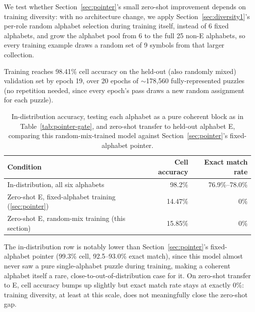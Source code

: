 \documentclass{article} %
\begin{document}
We test whether Section~\ref{sec:pointer}'s small zero-shot improvement
depends on training diversity: with no architecture change, we apply
Section~\ref{sec:diversity1}'s per-role random alphabet selection during
training itself, instead of 6 fixed alphabets, and grow the alphabet
pool from 6 to the full 25 non-E alphabets, so every training example
draws a random set of 9 symbols from that larger collection.

Training reaches 98.41\% cell accuracy on the held-out (also randomly
mixed) validation set by epoch 19, over 20 epochs of $\sim$178{,}560
fully-represented puzzles (no repetition needed, since every epoch's
pass draws a new random assignment for each puzzle).

\begin{table}[h]
\centering
\footnotesize
\begin{tabular}{lrr}
\hline
Condition & Cell accuracy & Exact match rate \\
\hline
In-distribution, all six alphabets & 98.2\% & 76.9\%--78.0\% \\
Zero-shot E, fixed-alphabet training (\ref{sec:pointer}) & 14.47\% & 0\% \\
Zero-shot E, random-mix training (this section) & 15.85\% & 0\% \\
\hline
\end{tabular}
\caption{In-distribution accuracy, testing each alphabet as a pure
coherent block as in Table~\ref{tab:pointer-gate}, and zero-shot transfer
to held-out alphabet E, comparing this random-mix-trained model against
Section~\ref{sec:pointer}'s fixed-alphabet pointer.}
\label{tab:diversity2-gate}
\end{table}

The in-distribution row is notably lower than Section~\ref{sec:pointer}'s
fixed-alphabet pointer (99.3\% cell, 92.5--93.0\% exact match), since
this model almost never saw a pure single-alphabet puzzle during
training, making a coherent alphabet itself a rare,
close-to-out-of-distribution case for it. On zero-shot transfer to E,
cell accuracy bumps up slightly but exact match rate stays at exactly
0\%: training diversity, at least at this scale, does not meaningfully
close the zero-shot gap.
\end{document}
